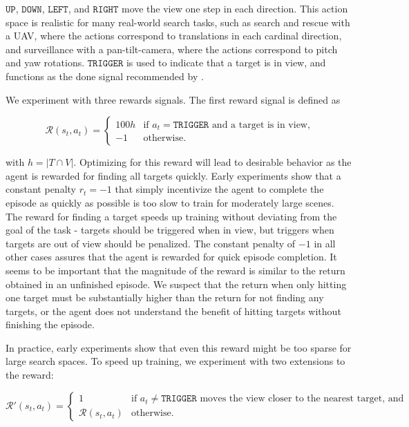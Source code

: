 \(\mathtt{UP}\), \(\mathtt{DOWN}\), \(\mathtt{LEFT}\), and \(\mathtt{RIGHT}\) move the view one step in each direction.
This action space is realistic for many real-world search tasks,
such as search and rescue with a UAV, where the actions correspond to translations in each cardinal direction,
and surveillance with a pan-tilt-camera, where the actions correspond to pitch and yaw rotations.
\(\mathtt{TRIGGER}\) is used to indicate that a target is in view, and functions as the done signal recommended by \cite{anderson_evaluation_2018}.


We experiment with three rewards signals.
The first reward signal is defined as

\begin{equation*}
    \mathcal{R}(s_t, a_t) =
    \begin{cases}
        100h & \text{if \(a_t = \mathtt{TRIGGER}\) and a target is in view,} \\
        -1   & \text{otherwise.}
    \end{cases}
\end{equation*}

with \(h = \left\lvert T \cap V \right\rvert\). 
Optimizing for this reward will lead to desirable behavior as the agent is rewarded for finding all targets quickly.
Early experiments show that a constant penalty \(r_t = -1\) that simply incentivize the agent to complete the episode as quickly as possible is too slow to train for moderately large scenes.
The reward for finding a target speeds up training without deviating from the goal of the task -
targets should be triggered when in view, but triggers when targets are out of view should be penalized.
The constant penalty of \(-1\) in all other cases assures that the agent is rewarded for quick episode completion.
It seems to be important that the magnitude of the reward is similar to the return obtained in an unfinished episode.
We suspect that the return when only hitting one target must be substantially higher than the return for not finding any targets,
or the agent does not understand the benefit of hitting targets without finishing the episode. 

In practice, early experiments show that even this reward might be too sparse for large search spaces.
To speed up training, we experiment with two extensions to the reward:

\begin{equation*}
    \mathcal{R}'(s_t, a_t) =
    \begin{cases}
        1 & \text{if \(a_t \neq \mathtt{TRIGGER}\) moves the view closer to the nearest target, and} \\
        \mathcal{R}(s_t, a_t) & \text{otherwise}.
    \end{cases}
\end{equation*}

